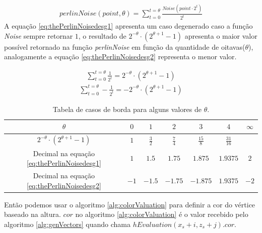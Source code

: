 \begin{equation}\label{eq:thePerlinNoise}
  \begin{split}
    perlinNoise(point, \theta) = \sum_{t=0}^{t=\theta} \frac{Noise(point \cdot 2^{t})}{2^{t}}
  \end{split}
\end{equation}
A equação \ref{eq:thePerlinNoisedesg1} apresenta um caso degenerado caso a função
\textit{Noise} sempre retornar $1$, o resultado de $2^{-\theta} \cdot (2^{\theta +1}-1)$
apresenta o maior valor possível retornado na função \textit{perlinNoise} em função da quantidade 
de oitavas($\theta$), analogamente a equação \ref{eq:thePerlinNoisedesg2} representa o menor valor.
 
\begin{equation}\label{eq:thePerlinNoisedesg1}
  \begin{split}
    \sum_{t=0}^{t=\theta} \frac{1}{2^{t}} = 2^{-\theta} \cdot (2^{\theta +1}-1)
  \end{split}
\end{equation}
\begin{equation}\label{eq:thePerlinNoisedesg2}
  \begin{split}
    \sum_{t=0}^{t=\theta} -\frac{1}{2^{t}} = -2^{-\theta} \cdot (2^{\theta +1}-1)
  \end{split}
\end{equation}

\begin{table}[H]
    \centering
    \caption{Tabela de casos de borda para alguns valores de $\theta$.}
    \label{tab:degenerateNoise}
    \begin{tabular}{| c | c c c c c c|}
        \hline
        $\theta$ & $0$ & $1$ & $2$ & $3$ & $4$ & $\infty$\\
        \hline
        $2^{-\theta} \cdot (2^{\theta +1}-1)$           & $1$  & $\frac{3}{2}$ & $\frac{7}{4}$ & $\frac{15}{8}$    & $\frac{31}{16}$ &   \\
        Decimal na equação \ref{eq:thePerlinNoisedesg1} & $1$  & $1.5$   & $1.75$  & $1.875$ & $1.9375$  & $2$  \\
        Decimal na equação \ref{eq:thePerlinNoisedesg2} & $-1$ & $-1.5$  & $-1.75$ & $-1.875$ & $1.9375$ & $-2$  \\
        \hline
    \end{tabular}
\end{table}

Então podemos
usar o algoritmo \ref{alg:colorValuation} para definir a cor do vértice baseado na altura.
$cor$ no algoritmo \ref{alg:colorValuation} é o valor recebido pelo algoritmo \ref{alg:genVectors}
quando chama $hEvaluation(x_{s} + i, z_{s} + j).cor$.

